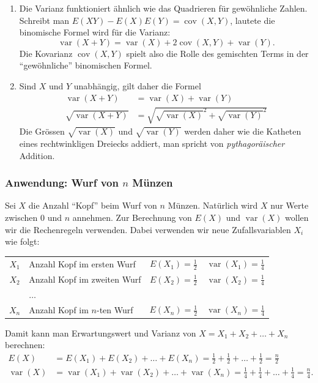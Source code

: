 \begin{enumerate}
\item
Die Varianz funktioniert ähnlich wie das Quadrieren für gewöhnliche Zahlen.
Schreibt man $E(XY)-E(X)E(Y)=\operatorname{cov}(X,Y)$, lautete die
binomische Formel wird für die Varianz:
\begin{equation}
\operatorname{var}(X+Y)=\operatorname{var}(X)
+2\operatorname{cov}(X,Y)
+\operatorname{var}(Y).
\label{var-summe-abhaengig}
\end{equation}
Die Kovarianz $\operatorname{cov}(X,Y)$ spielt also die Rolle des gemischten
Terms in der ``gewöhnliche'' binomischen Formel.
\item
Sind $X$ und $Y$ unabhängig, gilt daher die Formel
\begin{align*}
\operatorname{var}(X+Y)
&=
\operatorname{var}(X)
+
\operatorname{var}(Y)
\\
\sqrt{\operatorname{var}(X+Y)}
&=
\sqrt{
\sqrt{\operatorname{var}(X)}^2
+
\sqrt{\operatorname{var}(Y)}^2
}
\end{align*}
Die Grössen $\sqrt{\operatorname{var}(X)}$ und $\sqrt{\operatorname{var}(Y)}$
werden daher wie die Katheten eines rechtwinkligen Dreiecks addiert,
man spricht von {\it pythagoräischer} Addition.
\end{enumerate}

\subsubsection{Anwendung: Wurf von \texorpdfstring{$n$}{n} Münzen}
Sei $X$ die Anzahl ``Kopf'' beim Wurf von $n$ Münzen.
Natürlich wird
$X$ nur Werte zwischen $0$ und $n$ annehmen.
Zur Berechnung von $E(X)$ und $\operatorname{var}(X)$ wollen wir
die Rechenregeln verwenden.
Dabei verwenden wir neue Zufallsvariablen
$X_i$ wie folgt:
\begin{center}
\begin{tabular}{clcc}
$X_1$&Anzahl Kopf im ersten Wurf&$E(X_1)=\frac12$&$\operatorname{var}(X_1)=\frac14$\\
$X_2$&Anzahl Kopf im zweiten Wurf&$E(X_2)=\frac12$&$\operatorname{var}(X_2)=\frac14$\\
&$\dots$&&\\
$X_n$&Anzahl Kopf im $n$-ten Wurf&$E(X_n)=\frac12$&$\operatorname{var}(X_n)=\frac14$\\
\end{tabular}
\end{center}
Damit kann man Erwartungswert und Varianz von $X=X_1+X_2+\dots+X_n$ berechnen:
\begin{align*}
E(X)&=
E(X_1)+
E(X_2)+\dots+
E(X_n)
=
\frac{1}2+
\frac{1}2+\dots+
\frac{1}2=\frac{n}2
\\
\operatorname{var}(X)
&=
\operatorname{var}(X_1)
+
\operatorname{var}(X_2)
+\dots+
\operatorname{var}(X_n)
=\frac14+\frac14+\dots+\frac14=\frac{n}4.
\end{align*}


